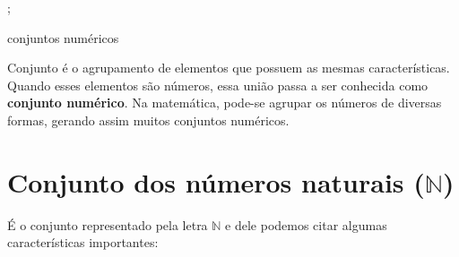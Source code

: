 \documentclass[10pt]{article}
\begin{document}
    ;
        \begin{center}
            {\LARGE {\sc conjuntos numéricos}}
        \end{center}

\begin{definicao}
Conjunto é o agrupamento de elementos que possuem as mesmas características. Quando esses elementos são números, essa união passa a ser conhecida como \textbf{conjunto numérico}. Na matemática, pode-se agrupar os números de diversas formas, gerando assim muitos conjuntos numéricos.
\end{definicao}

\section*{Conjunto dos números naturais (\( \mathbb{N} \))}
É o conjunto representado pela letra \( \mathbb{N}\) e dele podemos citar algumas características importantes:
\end{document}
